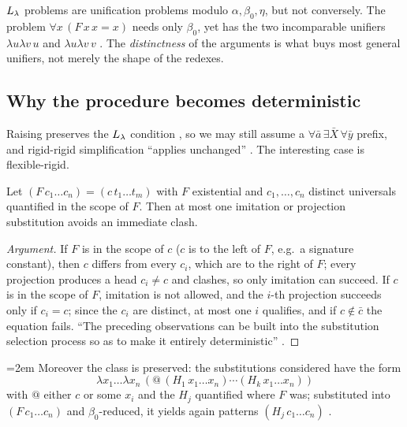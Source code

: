 \begin{pitfall}
$L_\lambda$ problems are unification problems modulo $\alpha,\beta_0,\eta$, but not conversely. The problem
$\forall x\,(F\,x\,x=x)$ needs only $\beta_0$, yet has the two incomparable unifiers $\lambda u\lambda v\,u$ and
$\lambda u\lambda v\,v$ . The \emph{distinctness} of the arguments is what buys most general unifiers,
not merely the shape of the redexes.
\end{pitfall}

\subsection{Why the procedure becomes deterministic}

Raising preserves the $L_\lambda$ condition , so we may still assume a $\forall\bar a\,\exists\bar X\,\forall\bar y$
prefix, and rigid-rigid simplification \enquote{applies unchanged} . The interesting case is
flexible-rigid.

\begin{lemma}\label{lem:hounif-one}
Let $(F\,c_1\dots c_n)=(c\,t_1\dots t_m)$ with $F$ existential and $c_1,\dots,c_n$ distinct universals quantified
in the scope of $F$. Then at most one imitation or projection substitution avoids an immediate clash.
\end{lemma}
\begin{proof}[Argument]
If $F$ is in the scope of $c$ ($c$ is to the left of $F$, e.g.\ a signature constant), then $c$ differs from every
$c_i$, which are to the right of $F$; every projection produces a head $c_i\ne c$ and clashes, so only
imitation can succeed. If $c$ is in the scope of $F$, imitation is not allowed, and the $i$-th projection
succeeds only if $c_i=c$; since the $c_i$ are distinct, at most one $i$ qualifies, and if $c\notin\bar c$ the
equation fails. \enquote{The preceding observations can be built into the substitution selection process so as to
make it entirely deterministic} .
\end{proof}

{\emergencystretch=2em
Moreover the class is preserved: the substitutions considered have the form
\[\lambda x_1\dots\lambda x_n\,(@\,(H_1\,x_1\dots x_n)\cdots(H_k\,x_1\dots x_n))\]
with $@$ either $c$ or some $x_i$ and the
$H_j$ quantified where $F$ was; substituted into $(F\,c_1\dots c_n)$ and $\beta_0$-reduced, it yields again
patterns $(H_j\,c_1\dots c_n)$ .\par}

